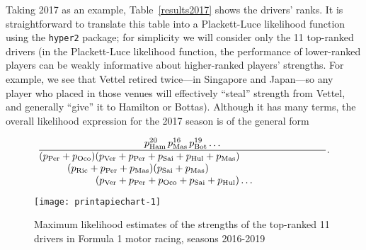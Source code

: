 \documentclass[a4,12pt]{article}
\begin{document}
Taking 2017 as an example, Table~\ref{results2017} shows the drivers'
ranks.  It is straightforward to translate this table into a
Plackett-Luce likelihood function using the \texttt{hyper2} package;
for simplicity we will consider only the 11 top-ranked drivers (in the
Plackett-Luce likelihood function, the performance of lower-ranked
players can be weakly informative about higher-ranked players'
strengths.  For example, we see that Vettel retired twice---in
Singapore and Japan---so any player who placed in those venues will
effectively ``steal'' strength from Vettel, and generally ``give'' it
to Hamilton or Bottas).  Although it has many terms, the overall
likelihood expression for the 2017 season is of the general form

\newcommand{\pham}{p_\mathrm{Ham}}
\newcommand{\pvet}{p_\mathrm{Vet}}
\newcommand{\pbot}{p_\mathrm{Bot}}
\newcommand{\prai}{p_\mathrm{Rai}}
\newcommand{\pric}{p_\mathrm{Ric}}
\newcommand{\pver}{p_\mathrm{Ver}}
\newcommand{\pper}{p_\mathrm{Per}}
\newcommand{\poco}{p_\mathrm{Oco}}
\newcommand{\psai}{p_\mathrm{Sai}}
\newcommand{\phul}{p_\mathrm{H\"{u}l}}
\newcommand{\pmas}{p_\mathrm{Mas}}

\begin{equation}
\frac{p_\mathrm{Ham}^{20}\,p_\mathrm{Mas}^{16}\,p_\mathrm{Bot}^{19}\ldots
}{\parbox{4in}{$(p_\mathrm{Per}+p_\mathrm{Oco})(p_\mathrm{Ver}+p_\mathrm{Per}+p_\mathrm{Sai}+p_\mathrm{Hul}+p_\mathrm{Mas})\\
    \rule{10mm}{0mm}(p_\mathrm{Ric}+p_\mathrm{Per}+p_\mathrm{Mas})(p_\mathrm{Sai}+p_\mathrm{Mas})\\ \rule{20mm}{0mm}
    (p_\mathrm{Ver}+ p_\mathrm{Per}+ p_\mathrm{Oco}+ p_\mathrm{Sai}+ p_\mathrm{Hul})\ldots
     $}}.
 \end{equation}

\begin{figure}
{\centering \texttt{[image: printapiechart-1]}}
\caption[\doublespacing Maximum likelihood estimates \label{piechartstrength} of the
  strengths of the top-ranked 11 drivers in Formula 1 motor racing,
  seasons 2016-2019]{\doublespacing Maximum likelihood
  estimates \label{piechartstrength} of the strengths of the
  top-ranked 11 drivers in Formula 1 motor racing, seasons
  2016-2019}\label{fig:printapiechart}
\end{figure}
\end{document}
